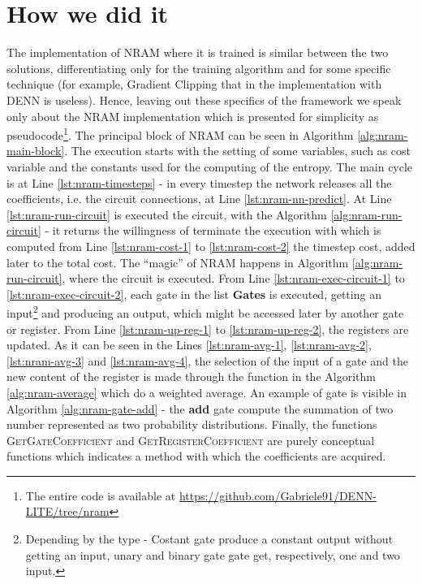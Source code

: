 \section{How we did it}
The implementation of NRAM where it is trained is similar between the two solutions, differentiating only for the training algorithm and for some specific technique (for example, Gradient Clipping that in the implementation with DENN is useless). Hence, leaving out these specifics of the framework we speak only about the NRAM implementation which is presented for simplicity as pseudocode\footnote{The entire code is available at \href{https://github.com/Gabriele91/DENN-LITE/tree/nram}{https://github.com/Gabriele91/DENN-LITE/tree/nram}}.\newline
The principal block of NRAM can be seen in Algorithm \ref{alg:nram-main-block}. The execution starts with the setting of some variables, such as cost variable and the constants used for the computing of the entropy. The main cycle is at Line \ref{lst:nram-timesteps} - in every timestep the network releases all the coefficients, i.e. the circuit connections, at Line \ref{lst:nram-nn-predict}. At Line \ref{lst:nram-run-circuit} is executed the circuit, with the Algorithm \ref{alg:nram-run-circuit} - it returns the willingness of terminate the execution with which is computed from Line \ref{lst:nram-cost-1} to \ref{lst:nram-cost-2} the timestep cost, added later to the total cost. The ``magic'' of NRAM happens in Algorithm \ref{alg:nram-run-circuit}, where the circuit is executed. From Line \ref{lst:nram-exec-circuit-1} to \ref{lst:nram-exec-circuit-2}, each gate in the list \textbf{Gates} is executed, getting an input\footnote{Depending by the type - Costant gate produce a constant output without getting an input, unary and binary gate gate get, respectively, one and two input.} and producing an output, which might be accessed later by another gate or register. From Line \ref{lst:nram-up-reg-1} to \ref{lst:nram-up-reg-2}, the registers are updated. As it can be seen in the Lines \ref{lst:nram-avg-1}, \ref{lst:nram-avg-2}, \ref{lst:nram-avg-3} and \ref{lst:nram-avg-4}, the selection of the input of a gate and the new content of the register is made through the function in the Algorithm \ref{alg:nram-average} which do a weighted average. An example of gate is visible in Algorithm \ref{alg:nram-gate-add} - the \textbf{add} gate compute the summation of two number represented as two probability distributions. Finally, the functions \textsc{GetGateCoefficient} and \textsc{GetRegisterCoefficient} are purely conceptual functions which indicates a method with which the coefficients are acquired.\newline\newline
